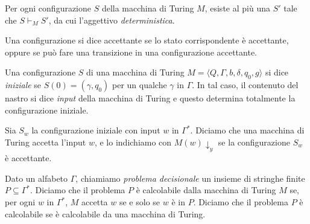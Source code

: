 \begin{osservazione}
 Per ogni configurazione $S$ della macchina di Turing $M$, esiste al più una
 $S'$ tale che $S \vdash_M S'$, da cui l'aggettivo \emph{deterministica}.
\end{osservazione}


\begin{definizione}
 Una configurazione si dice accettante se lo stato corrispondente è accettante,
 oppure se può fare una transizione in una configurazione accettante.
\end{definizione}

\begin{definizione}
 Una configurazione $S$ di una macchina di Turing
 $M=\langle Q, \Gamma, b, \delta, q_0, g \rangle$ si dice \emph{iniziale} se
 $S(0) = (\gamma, q_0)$ per un qualche $\gamma$ in $\Gamma$. In tal caso, il contenuto del nastro
 si dice \emph{input} della macchina di Turing e questo determina totalmente
 la configurazione iniziale.
\end{definizione}

\begin{definizione}
\label{def:accept-input}
 Sia $S_w$ la configurazione iniziale con input $w$ in $\Gamma^\ast$. Diciamo che
 una macchina di Turing accetta l'input $w$, e lo indichiamo con $M(w)\downarrow_y$
 se la configurazione $S_w$ è accettante.
\end{definizione}

\begin{definizione}
\label{def:problem}
 Dato un alfabeto $\Gamma$, chiamiamo \emph{problema decisionale} un insieme di stringhe finite
 $P \subseteq \Gamma^\ast$. Diciamo che il problema $P$ è calcolabile dalla macchina
 di Turing $M$ se, per ogni $w$ in $\Gamma^\ast$, $M$ accetta $w$ se e solo se $w$
 è in $P$. Diciamo che il problema $P$ è calcolabile se è calcolabile da una
 macchina di Turing.
\end{definizione}

